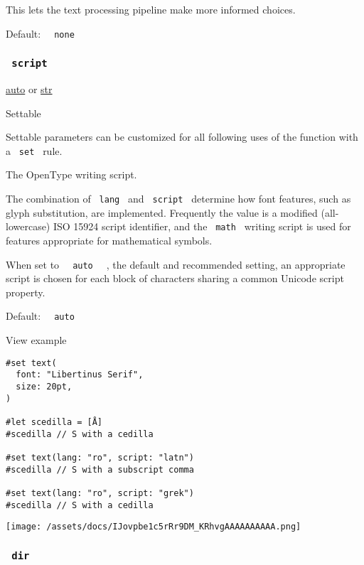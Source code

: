 This lets the text processing pipeline make more informed choices.

Default: \texttt{\ }{\texttt{\ none\ }}\texttt{\ }

\subsubsection{\texorpdfstring{\texttt{\ script\ }}{ script }}\label{parameters-script}

\href{/docs/reference/foundations/auto/}{auto} {or}
\href{/docs/reference/foundations/str/}{str}

{{ Settable }}

\label{parameters-script-settable-tooltip}
Settable parameters can be customized for all following uses of the
function with a \texttt{\ set\ } rule.

The OpenType writing script.

The combination of \texttt{\ lang\ } and \texttt{\ script\ } determine
how font features, such as glyph substitution, are implemented.
Frequently the value is a modified (all-lowercase) ISO 15924 script
identifier, and the \texttt{\ math\ } writing script is used for
features appropriate for mathematical symbols.

When set to \texttt{\ }{\texttt{\ auto\ }}\texttt{\ } , the default and
recommended setting, an appropriate script is chosen for each block of
characters sharing a common Unicode script property.

Default: \texttt{\ }{\texttt{\ auto\ }}\texttt{\ }


View example

\begin{verbatim}
#set text(
  font: "Libertinus Serif",
  size: 20pt,
)

#let scedilla = [Å]
#scedilla // S with a cedilla

#set text(lang: "ro", script: "latn")
#scedilla // S with a subscript comma

#set text(lang: "ro", script: "grek")
#scedilla // S with a cedilla
\end{verbatim}

\texttt{[image: /assets/docs/IJovpbe1c5rRr9DM\_KRhvgAAAAAAAAAA.png]}

\subsubsection{\texorpdfstring{\texttt{\ dir\ }}{ dir }}\label{parameters-dir}

